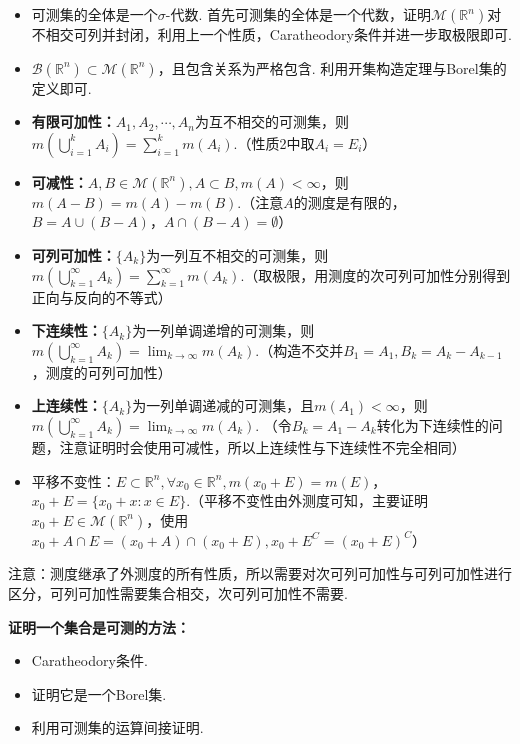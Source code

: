 \documentclass[bwprint, withoutpreface]{cumcmthesis}
\begin{document}
\begin{itemize}[itemindent=2em]
	\item 可测集的全体是一个$\sigma$-代数.
	首先可测集的全体是一个代数，证明$\mathcal{M}(\mathbb{R}^n)$对不相交可列并封闭，利用上一个性质，Caratheodory条件并进一步取极限即可.
	\item $\mathcal{B}(\mathbb{R}^n) \subset \mathcal{M}(\mathbb{R}^n)$，且包含关系为严格包含.
	利用开集构造定理与Borel集的定义即可.
	\item \textbf{有限可加性：}$A_1, A_2, \cdots, A_n$为互不相交的可测集，则$m(\bigcup_{i = 1}^{k}{A_i}) = \sum_{i = 1}^{k}{m(A_i)}$.（性质2中取$A_i = E_i$）
	\item \textbf{可减性：}$A, B \in \mathcal{M}(\mathbb{R}^n), A \subset B, m(A) < \infty$，则$m(A - B) = m(A) - m(B).$（注意$A$的测度是有限的，$B = A \cup (B - A)$，$A \cap (B - A) = \emptyset$）
	\item \textbf{可列可加性：}$\{A_k\}$为一列互不相交的可测集，则$m(\bigcup_{k = 1}^{\infty}{A_k}) = \sum_{k = 1}^{\infty}{m(A_k)}$.（取极限，用测度的次可列可加性分别得到正向与反向的不等式）
	\item \textbf{下连续性：}$\{A_k\}$为一列单调递增的可测集，则$m(\bigcup_{k = 1}^{\infty}{A_k}) = \lim_{k \to \infty} m(A_k)$.（构造不交并$B_1 = A_1, B_k = A_k - A_{k - 1}$，测度的可列可加性）
	\item \textbf{上连续性：}$\{A_k\}$为一列单调递减的可测集，且$m(A_1) < \infty$，则$m(\bigcup_{k = 1}^{\infty}{A_k}) = \lim_{k \to \infty} m(A_k)$. （令$B_k = A_1 - A_k$转化为下连续性的问题，注意证明时会使用可减性，所以上连续性与下连续性不完全相同）
	\item 平移不变性：$E \subset \mathbb{R}^n, \forall x_0 \in \mathbb{R}^n, m(x_0 + E) = m(E)$，$x_0 + E = \{x_0 + x: x \in E\}$.（平移不变性由外测度可知，主要证明$x_0 + E \in \mathcal{M}(\mathbb{R}^n)$，使用$x_0 + A \cap E = (x_0 + A) \cap (x_0 + E), x_0 + E^C = (x_0 + E)^C$）
\end{itemize}

注意：测度继承了外测度的所有性质，所以需要对次可列可加性与可列可加性进行区分，可列可加性需要集合相交，次可列可加性不需要.

\textbf{证明一个集合是可测的方法：}
\begin{itemize}[itemindent=2em]
	\item Caratheodory条件.
	\item 证明它是一个Borel集.
	\item 利用可测集的运算间接证明.
\end{itemize}
\end{document}
